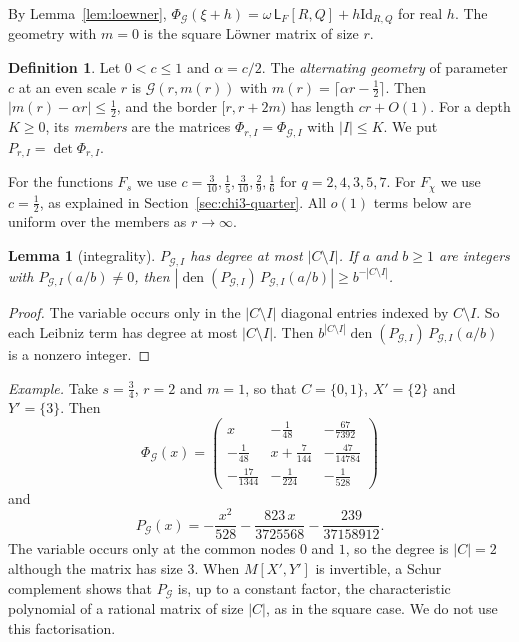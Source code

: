 \documentclass[11pt]{amsart}
\newtheorem{lemma}[theorem]{Lemma}
\theoremstyle{definition}
\newtheorem{definition}[theorem]{Definition}
\theoremstyle{remark}
\numberwithin{equation}{section}
\newcommand{\den}{\operatorname{den}}
\newcommand{\Lw}{\mathsf L}          %
\newcommand{\Id}{\mathrm{Id}}
\begin{document}
By Lemma~\ref{lem:loewner}, $\Phi_{\mathcal G}(\xi+h)=\omega\,\Lw_F[R,Q]+h\Id_{R,Q}$ for real $h$. The geometry with
$m=0$ is the square L\"owner matrix of size $r$.

\begin{definition}\label{def:altgeom}
Let $0<c\le1$ and $\alpha=c/2$. The \emph{alternating geometry} of parameter $c$ at an even scale $r$ is
$\mathcal G(r,m(r))$ with $m(r)=\lceil\alpha r-\frac12\rceil$. Then $|m(r)-\alpha r|\le\frac12$, and the border
$[r,r+2m)$ has length $cr+O(1)$. For a depth $K\ge0$, its \emph{members} are the matrices
$\Phi_{r,I}=\Phi_{\mathcal G,I}$ with $|I|\le K$. We put $P_{r,I}=\det\Phi_{r,I}$.
\end{definition}

For the functions $F_s$ we use $c=\frac3{10},\frac15,\frac3{10},\frac29,\frac16$ for $q=2,4,3,5,7$. For $F_\chi$ we use
$c=\frac12$, as explained in Section~\ref{sec:chi3-quarter}. All $o(1)$ terms below are uniform over the members as
$r\to\infty$.

\begin{lemma}[integrality]\label{lem:integrality}
$P_{\mathcal G,I}$ has degree at most $|C\setminus I|$. If $a$ and $b\ge1$ are integers with
$P_{\mathcal G,I}(a/b)\ne0$, then $|\den(P_{\mathcal G,I})\,P_{\mathcal G,I}(a/b)|\ge b^{-|C\setminus I|}$.
\end{lemma}
\begin{proof}
The variable occurs only in the $|C\setminus I|$ diagonal entries indexed by $C\setminus I$. So each Leibniz term has
degree at most $|C\setminus I|$. Then $b^{|C\setminus I|}\den(P_{\mathcal G,I})\,P_{\mathcal G,I}(a/b)$ is a nonzero
integer.
\end{proof}

\emph{Example.} Take $s=\frac34$, $r=2$ and $m=1$, so that $C=\{0,1\}$, $X'=\{2\}$ and $Y'=\{3\}$. Then
\[
 \Phi_{\mathcal G}(x)=\begin{pmatrix}
 x & -\frac1{48} & -\frac{67}{7392}\\[2pt]
 -\frac1{48} & x+\frac7{144} & -\frac{47}{14784}\\[2pt]
 -\frac{17}{1344} & -\frac1{224} & -\frac1{528}
 \end{pmatrix}
\]
and
\[
 P_{\mathcal G}(x)=-\frac{x^2}{528}-\frac{823\,x}{3725568}-\frac{239}{37158912}.
\]
The variable occurs only at the common nodes $0$ and $1$, so the degree is $|C|=2$ although the matrix has size $3$. When $M[X',Y']$ is invertible, a Schur complement shows that $P_{\mathcal G}$
is, up to a constant factor, the characteristic polynomial of a rational matrix of size $|C|$, as in the square case.
We do not use this factorisation.
\end{document}

